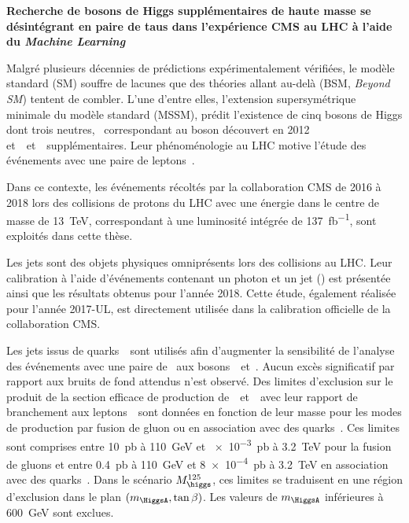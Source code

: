 \begin{center}
\LARGE
\bf
\sffamily
Recherche de bosons de Higgs supplémentaires de haute masse se désintégrant en paire de taus dans l'expérience CMS au LHC à l'aide du \emph{Machine Learning}
\end{center}
\bigskip

Malgré plusieurs décennies de prédictions expérimentalement vérifiées,
le modèle standard (SM) souffre de lacunes
que des théories allant au-delà (BSM, \emph{Beyond SM})
tentent de combler.
L'une d'entre elles,
l'extension supersymétrique minimale du modèle standard (MSSM),
prédit l'existence de cinq bosons de Higgs dont trois neutres,
\higgs\ correspondant au boson découvert en 2012
et~\Higgs\ et~\HiggsA\ supplémentaires.
Leur phénoménologie au LHC
motive l'étude des événements avec une paire de leptons~\tau.
\par
Dans ce contexte,
les événements récoltés par la collaboration CMS
de 2016 à 2018
lors des collisions de protons du LHC
avec une énergie dans le centre de masse de \SI{13}{\TeV},
correspondant à une luminosité intégrée de \SI{137}{\femto\barn^{-1}},
sont exploités dans cette thèse.
\par
Les jets sont des objets physiques omniprésents lors des collisions au LHC.
Leur calibration à l'aide d'événements contenant un photon et un jet (\Gjet) est présentée ainsi que les résultats obtenus pour l'année 2018.
Cette étude,
également réalisée pour l'année 2017-UL,
est directement utilisée dans la calibration officielle de la collaboration CMS.
\par
Les jets issus de quarks~\quarkb\ sont utilisés afin d'augmenter la sensibilité de l'analyse
des événements avec une paire de \tau\ aux bosons~\Higgs\ et~\HiggsA.
Aucun excès significatif par rapport aux bruits de fond attendus n'est observé.
Des limites d'exclusion sur le produit de la section efficace de production de~\Higgs\ et~\HiggsA\ avec leur rapport de branchement aux leptons~\tau\ sont données
en fonction de leur masse
pour les modes de production par fusion de gluon ou en association avec des quarks~\quarkb.
Ces limites sont comprises entre
\SI{10}{\pico\barn} à \SI{110}{\GeV}
et
\SI{e-3}{\pico\barn} à \SI{3.2}{\TeV}
pour la fusion de gluons
et entre
\SI{0.4}{\pico\barn} à \SI{110}{\GeV}
et
\SI{8e-4}{\pico\barn} à \SI{3.2}{\TeV}
en association avec des quarks~\quarkb.
Dans le scénario $M_{\higgs}^{125}$,
ces limites se traduisent en une région d'exclusion dans le plan $(m_{\HiggsA},\tan\beta)$.
Les valeurs de $m_{\HiggsA}$ inférieures à \SI{600}{\GeV} sont exclues.
